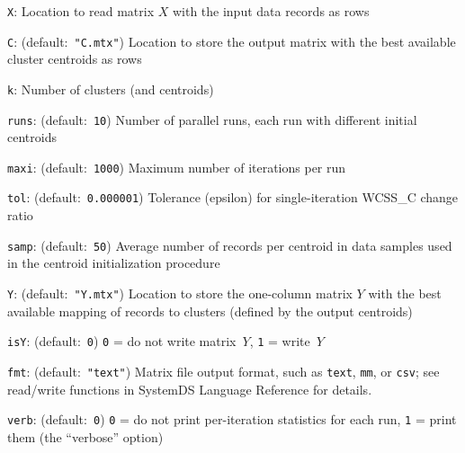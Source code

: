 \smallskip
{}
\begin{Description}
\item[{\tt X}:]
Location to read matrix $X$ with the input data records as rows
\item[{\tt C}:] (default:\mbox{ }{\tt "C.mtx"})
Location to store the output matrix with the best available cluster centroids as rows
\item[{\tt k}:]
Number of clusters (and centroids)
\item[{\tt runs}:] (default:\mbox{ }{\tt 10})
Number of parallel runs, each run with different initial centroids
\item[{\tt maxi}:] (default:\mbox{ }{\tt 1000})
Maximum number of iterations per run
\item[{\tt tol}:] (default:\mbox{ }{\tt 0.000001})
Tolerance (epsilon) for single-iteration WCSS\_C change ratio
\item[{\tt samp}:] (default:\mbox{ }{\tt 50})
Average number of records per centroid in data samples used in the centroid
initialization procedure
\item[{\tt Y}:] (default:\mbox{ }{\tt "Y.mtx"})
Location to store the one-column matrix $Y$ with the best available mapping of
records to clusters (defined by the output centroids)
\item[{\tt isY}:] (default:\mbox{ }{\tt 0})
{\tt 0} = do not write matrix~$Y$,  {\tt 1} = write~$Y$
\item[{\tt fmt}:] (default:\mbox{ }{\tt "text"})
Matrix file output format, such as {\tt text}, {\tt mm}, or {\tt csv};
see read/write functions in SystemDS Language Reference for details.
\item[{\tt verb}:] (default:\mbox{ }{\tt 0})
{\tt 0} = do not print per-iteration statistics for each run, {\tt 1} = print them
(the ``verbose'' option)
\end{Description}
\smallskip
{}
